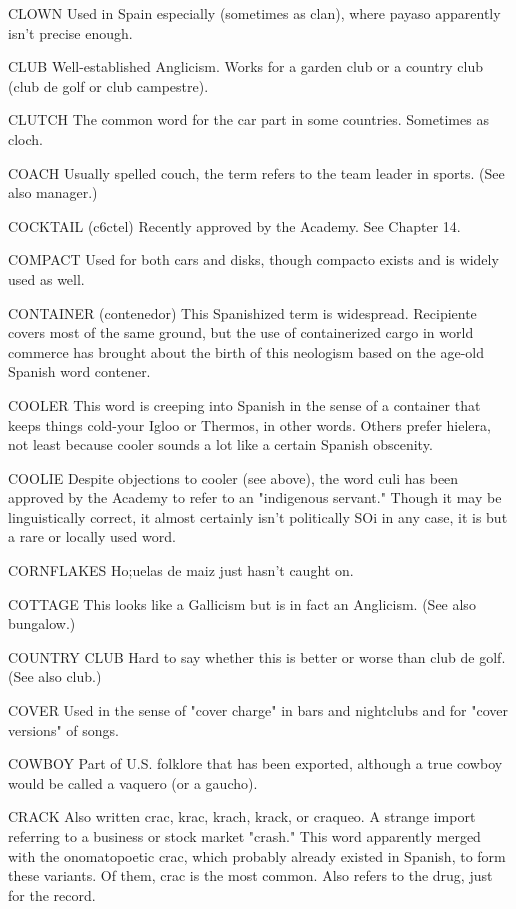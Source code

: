 CLOWN Used in Spain especially (sometimes as clan), where
payaso apparently isn't precise enough.

CLUB Well-established Anglicism. Works for a garden club or
a country club (club de golf or club campestre).

CLUTCH The common word for the car part in some countries. Sometimes as cloch.

COACH Usually spelled couch, the term refers to the team
leader in sports. (See also manager.)

COCKTAIL (c6ctel) Recently approved by the Academy. See
Chapter 14.

COMPACT Used for both cars and disks, though compacto exists and is widely used as well.

CONTAINER (contenedor) This Spanishized term is widespread. Recipiente covers most of the same ground, but the use of containerized cargo in world commerce has brought about the birth of this
neologism based on the age-old Spanish word contener.

COOLER This word is creeping into Spanish in the sense of
a container that keeps things cold-your Igloo or Thermos, in other
words. Others prefer hielera, not least because cooler sounds a lot like
a certain Spanish obscenity.

COOLIE Despite objections to cooler (see above), the word
culi has been approved by the Academy to refer to an "indigenous servant." Though it may be linguistically correct, it almost certainly isn't
politically SOi in any case, it is but a rare or locally used word.

CORNFLAKES Ho;uelas de maiz just hasn't caught on.

COTTAGE This looks like a Gallicism but is in fact an Anglicism. (See also bungalow.)

COUNTRY CLUB Hard to say whether this is better or worse
than club de golf. (See also club.)

COVER Used in the sense of "cover charge" in bars and nightclubs and for "cover versions" of songs.

COWBOY Part of U.S. folklore that has been exported, although a true cowboy would be called a vaquero (or a gaucho).

CRACK Also written crac, krac, krach, krack, or craqueo. A
strange import referring to a business or stock market "crash." This
word apparently merged with the onomatopoetic crac, which probably
already existed in Spanish, to form these variants. Of them, crac is the
most common. Also refers to the drug, just for the record.

